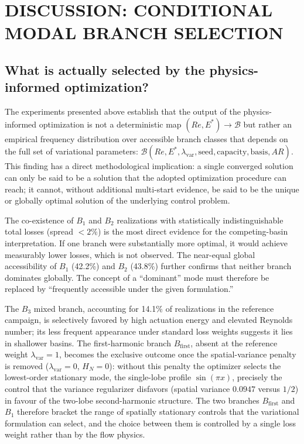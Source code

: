 \documentclass[a4paper,11pt]{article}
\begin{document}
\section{DISCUSSION: CONDITIONAL MODAL BRANCH SELECTION}
\label{sec:discussion}

\subsection{What is actually selected by the physics-informed optimization?}

The experiments presented above establish that the output of the physics-informed
optimization is not a deterministic map \((Re,E^*)\to\mathcal{B}\) but rather
an empirical frequency distribution over accessible branch classes that depends
on the full set of variational parameters:
\(\mathcal{B}(Re,E^*,\lambda_{\mathrm{var}},\text{seed},\text{capacity},\text{basis},AR)\).
This finding has a direct methodological implication: a single converged solution
can only be said to be a solution that the adopted optimization procedure can reach;
it cannot, without additional multi-start evidence, be said to be the unique or
globally optimal solution of the underlying control problem.

The co-existence of \(B_1\) and \(B_2\) realizations with statistically
indistinguishable total losses (spread \(<2\%\)) is the most direct evidence for
the competing-basin interpretation. If one branch were substantially more optimal,
it would achieve measurably lower losses, which is not observed. The near-equal
global accessibility of \(B_1\) (42.2\%) and \(B_2\) (43.8\%) further confirms
that neither branch dominates globally. The concept of a ``dominant'' mode must
therefore be replaced by ``frequently accessible under the given formulation.''

The \(B_3\) mixed branch, accounting for 14.1\% of realizations in the reference
campaign, is selectively favored by high actuation energy and elevated Reynolds
number; its less frequent appearance under standard loss weights suggests it lies
in shallower basins. The first-harmonic branch \(B_{\mathrm{first}}\), absent at the
reference weight \(\lambda_{\mathrm{var}}=1\), becomes the exclusive outcome once
the spatial-variance penalty is removed (\(\lambda_{\mathrm{var}}=0\), \(H_N=0\)):
without this penalty the optimizer selects the lowest-order stationary mode, the
single-lobe profile \(\sin(\pi x)\), precisely the control that the variance
regularizer disfavors (spatial variance \(0.0947\) versus \(1/2\)) in favour of the
two-lobe second-harmonic structure. The two
branches \(B_{\mathrm{first}}\) and \(B_1\) therefore bracket the range of spatially
stationary controls that the variational formulation can select, and the choice
between them is controlled by a single loss weight rather than by the flow physics.
\end{document}
